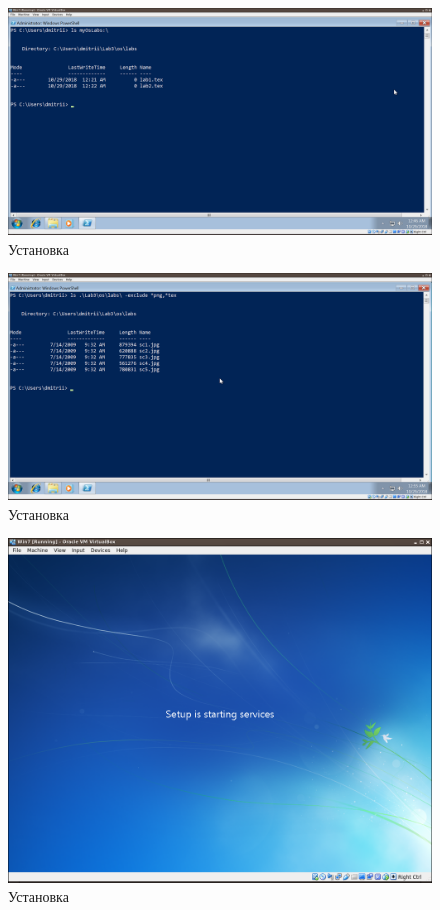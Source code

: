 \documentclass[a4paper]{article}
\begin{document}
\begin{figure}[H]
    \centering
    \includegraphics[width=\linewidth]{15.png}
    \caption{Установка}
\end{figure}

\begin{figure}[H]
    \centering
    \includegraphics[width=\linewidth]{16.png}
    \caption{Установка}
\end{figure}    

\begin{figure}[H]
    \centering
    \includegraphics[width=\linewidth]{17.png}
    \caption{Установка}
\end{figure}
\end{document}
